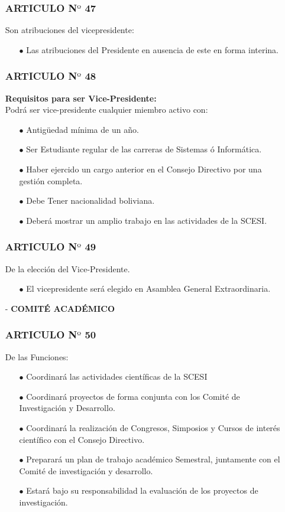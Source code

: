 \documentclass[11pt,letterpaper]{book}
\begin{document}
\begin{itemize}
\subsubsection*{ARTICULO N$º$ 47}
Son atribuciones del vicepresidente:
\begin{itemize}
\item[$\bullet$] Las atribuciones del Presidente en ausencia de este en forma interina.
\end{itemize}

\subsubsection*{ARTICULO N$º$ 48}
{\bf Requisitos para ser Vice-Presidente:}\\
Podrá ser vice-presidente cualquier miembro activo con: 
\begin{itemize}
\item[$\bullet$] Antigüedad mínima de un año. 
\item[$\bullet$] Ser Estudiante regular de las carreras de Sistemas ó Informática. 
\item[$\bullet$] Haber ejercido un cargo anterior en el Consejo Directivo por una gestión completa. 
\item[$\bullet$] Debe Tener nacionalidad boliviana.  
\item[$\bullet$] Deberá mostrar un amplio trabajo en las actividades de la SCESI.
\end{itemize}
         
\subsubsection*{ARTICULO N$º$ 49}
De la elección del Vice-Presidente.
\begin{itemize}
\item[$\bullet$] El vicepresidente será elegido en Asamblea General Extraordinaria.
\end{itemize}
\item[-] {\bf COMITÉ ACADÉMICO}
\subsubsection*{ARTICULO N$º$ 50}
De las Funciones:
\begin{itemize}
\item[$\bullet$] Coordinará las actividades científicas de la SCESI 
\item[$\bullet$] Coordinará proyectos de forma conjunta con los Comité de Investigación y Desarrollo. 
\item[$\bullet$] Coordinará la realización de Congresos, Simposios y Cursos de interés científico con el Consejo Directivo. 
\item[$\bullet$] Preparará un plan de trabajo académico Semestral, juntamente con el Comité de investigación y desarrollo. 
\item[$\bullet$] Estará bajo su responsabilidad la evaluación de los proyectos de investigación. 
\end{itemize}

\end{itemize}
\end{document}
